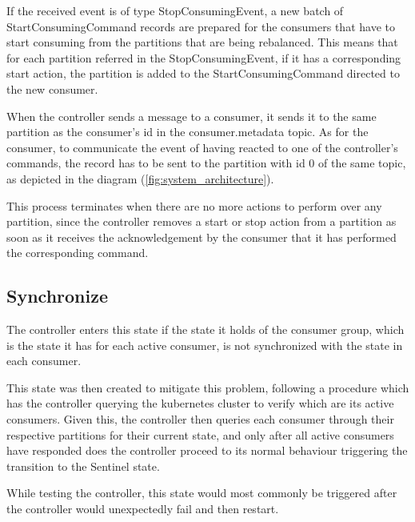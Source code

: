 If the received event is of type StopConsumingEvent, a new batch of
StartConsumingCommand records are prepared for the consumers that have to start
consuming from the partitions that are being rebalanced. This means that for
each partition referred in the StopConsumingEvent, if it has a corresponding
start action, the partition is added to the StartConsumingCommand directed to
the new consumer. 

When the controller sends a message to a consumer, it sends it to the same
partition as the consumer's id in the consumer.metadata topic. As for
the consumer, to communicate the event of having reacted to one of the
controller's commands, the record has to be sent to the partition with id $0$ of
the same topic, as depicted in the diagram (\ref{fig:system_architecture}).

This process terminates when there are no more actions to perform over any
partition, since the controller removes a start or stop action from a partition
as soon as it receives the acknowledgement by the consumer that it has performed
the corresponding command.

\subsection{Synchronize}

The controller enters this state if the state it holds of the consumer group,
which is the state it has for each active consumer, is not synchronized with the
state in each consumer. 

This state was then created to mitigate this problem, following a procedure
which has the controller querying the kubernetes cluster to verify which are its
active consumers. Given this, the controller then queries each consumer through
their respective partitions for their current state, and only after all active
consumers have responded does the controller proceed to its normal behaviour
triggering the transition to the Sentinel state.

While testing the controller, this state would most commonly be triggered after
the controller would unexpectedly fail and then restart.
